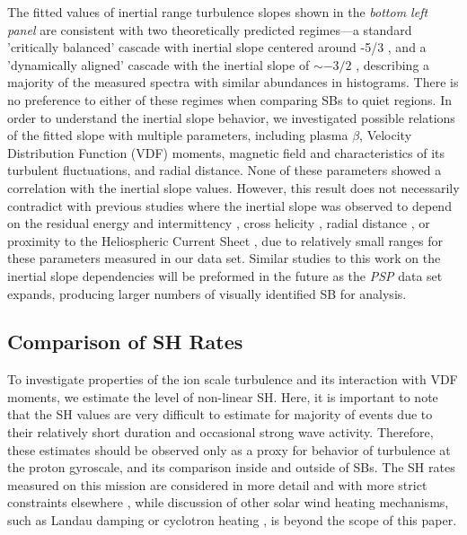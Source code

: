 \documentclass[]{aastex62}
\begin{document}
The fitted values of inertial range turbulence slopes shown in the \emph{bottom left panel} are consistent with two theoretically predicted regimes---a standard 'critically balanced' cascade with inertial slope centered around -5/3 \citep{Goldreich_1995}, and a 'dynamically aligned' cascade with the inertial slope of $\sim -3/2$ \citep{Boldyrev_2006_PhRvL}, describing a majority of the measured spectra with similar abundances in histograms. There is no preference to either of these regimes when comparing SBs to quiet regions. In order to understand the inertial slope behavior, we investigated possible relations of the fitted slope with multiple parameters, including plasma $\beta$, Velocity Distribution Function (VDF) moments, magnetic field and characteristics of its turbulent fluctuations, and radial distance. None of these parameters showed a correlation with the inertial slope values. However, this result does not necessarily contradict with previous studies where the inertial slope was observed to depend on the residual energy and intermittency \citep{Bowen_2018_ApJ}, cross helicity \citep{Chen_2013_ApJ}, radial distance \citep{Chen_2020_ApJS}, or proximity to the Heliospheric Current Sheet \citep{Chen_2021_AA}, due to relatively small ranges for these parameters measured in our data set. Similar studies to this work on the inertial slope dependencies will be preformed in the future as the \emph{PSP} data set expands, producing larger numbers of visually identified SB for analysis.


\subsection{Comparison of SH Rates}
\label{sec:Results_SH}

To investigate properties of the ion scale turbulence and its interaction with VDF moments, we estimate the level of non-linear SH. Here, it is important to note that the SH values are very difficult to estimate for majority of events due to their relatively short duration and occasional strong wave activity. Therefore, these estimates should be observed only as a proxy for behavior of turbulence at the proton gyroscale, and its comparison inside and outside of SBs. The SH rates measured on this mission are considered in more detail and with more strict constraints elsewhere \citep{Martinovic_2020_ApJS}, while discussion of other solar wind heating mechanisms, such as Landau damping \citep{Quataert_1998,Chen_2019} or cyclotron heating \citep{Hollweg_1999JGR_1,Kasper_2013}, is beyond the scope of this paper.
\end{document}
